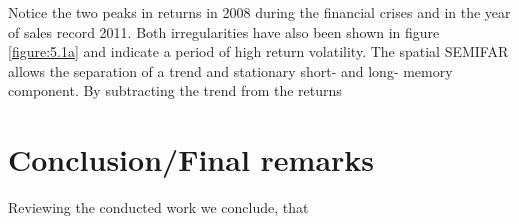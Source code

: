 \documentclass[12pt]{article}
\begin{document}
\linebreak
Notice the two peaks in returns in 2008 during the financial crises and in the year of sales record 2011. Both irregularities have also been shown in figure \ref{figure:5.1a} and indicate a period of high return volatility.
The spatial SEMIFAR allows the separation of a trend and stationary short- and long- memory component. By subtracting the trend from the returns

\section{Conclusion/Final remarks}
Reviewing the conducted work we conclude, that


\printbibliography[heading=bibintoc]

\end{document}
